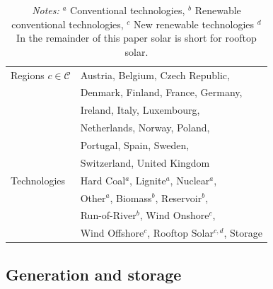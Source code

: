 \documentclass[authoryear]{elsarticle}
\begin{document}
\begin{table}[!htb]\renewcommand{\baselinestretch}{1}\normalsize\footnotesize
	\centering
	\caption{Model specifications: regions and technologies covered in the model framework.}
	\vspace{-1ex}
	
	\begin{tabular*}{\columnwidth}{@{}@{\extracolsep{\fill}}ll@{}} 
		\toprule
		\toprule
		Regions $c\in \mathcal{C}$ & Austria, Belgium, Czech Republic, \\
		& Denmark, Finland, France, Germany, \\
		&Ireland, Italy, Luxembourg, \\
		& Netherlands, Norway, Poland, \\
		&Portugal, Spain, Sweden, \\
		&Switzerland, United Kingdom	\\
		Technologies & Hard Coal$^a$, Lignite$^a$, Nuclear$^a$,\\
		& Other$^a$, Biomass$^{b}$, Reservoir$^{b}$,\\
		& Run-of-River$^{b}$,  Wind Onshore$^c$, \\
		& Wind Offshore$^c$, Rooftop Solar$^{c,d}$, Storage\\
		\bottomrule
	\end{tabular*}
	\label{tab:countries_technologies}%
	\vspace{0ex}
	\caption*{\emph{Notes:} $^a$ Conventional technologies,	$^b$ Renewable conventional technologies,
		$^c$ New renewable technologies $^d$ In the remainder of this paper solar is short for rooftop solar.}
	
\end{table}

\subsection{Generation and storage}
\label{calib:gen_stor}
\end{document}
